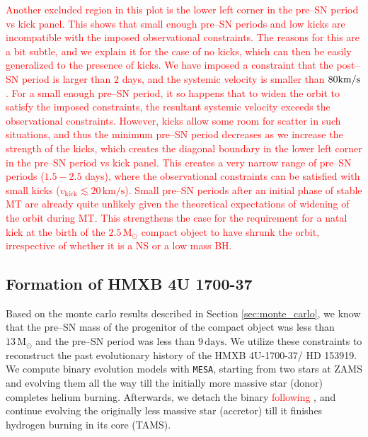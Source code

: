\documentclass[linenumbers,trackchanges,twocolumn]{aastex701}
\newcommand{\Mdot}{\mathrm{M}_{\odot}}
\newcommand{\red}{\textcolor{red}}
\begin{document}
\red{Another excluded region in this plot is the lower left corner in the pre--SN period vs kick panel. This shows that small enough pre--SN periods and low kicks are incompatible with the imposed observational constraints. The reasons for this are a bit subtle, and we explain it for the case of no kicks, which can then be easily generalized to the presence of kicks. We have imposed a constraint that the post--SN period is larger than $2$ days, and the systemic velocity is smaller than $80\rm km/s$. For a small enough pre--SN period, it so happens that to widen the orbit to satisfy the imposed constraints, the resultant systemic velocity exceeds the observational constraints. However, kicks allow some room for scatter in such situations, and thus the minimum pre--SN period decreases as we increase the strength of the kicks, which creates the diagonal boundary in the lower left corner in the pre--SN period vs kick panel.
This creates a very narrow range of pre--SN periods ($1.5-2.5$ days), where the observational constraints can be satisfied with small kicks ($v_{\mathrm{kick}} \lesssim 20 \, \mathrm{km/s}$). Small pre--SN periods after an initial phase of stable MT are already quite unlikely given the theoretical expectations of widening of the orbit during MT. This strengthens the case for the requirement for a natal kick at the birth of the $2.5 \,\Mdot$ compact object to have shrunk the orbit, irrespective of whether it is a NS or a low mass BH.}

\subsection{Formation of HMXB 4U 1700-37}\label{sec:mesa_xrb}

Based on the monte carlo results described in Section \ref{sec:monte_carlo}, we know that the pre--SN mass of the progenitor of the compact object was less than $13\,\Mdot$ and the pre--SN period was less than $9\, \mathrm{days}$. We utilize these constraints to reconstruct the past evolutionary history of the HMXB 4U-1700-37/ HD 153919. We compute binary evolution models with \texttt{MESA}, starting from two stars at ZAMS and evolving them all the way till the initially more massive star (donor) completes helium burning. Afterwards, we detach the binary \red{following \citep{2023ApJ...942L..32R}}, and continue evolving the originally less massive star (accretor) till it finishes hydrogen burning in its core (TAMS). 
\end{document}
